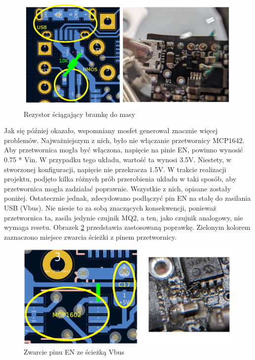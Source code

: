 \begin{figure}[H]
    \centering
    \includegraphics[width=\textwidth, height=\textheight, keepaspectratio]{Graphics/fix_gate.png}
    \caption{Rezystor ściągający bramkę do masy}
    \label{img:fix_gate}
\end{figure}
Jak się później okazało, wspomniany mosfet generował znacznie więcej problemów. Najważniejszym z nich, było nie włączanie przetwornicy MCP1642. Aby przetwornica mogła być włączona, napięcie na pinie EN, powinno wynosić 0.75 * Vin\cite{mcp_datasheet}. W przypadku tego układu, wartość ta wynosi 3.5V. Niestety, w stworzonej konfiguracji, napięcie nie przekracza 1.5V. W trakcie realizacji projektu, podjęto kilka różnych prób przerobienia układu w taki sposób, aby przetwornica mogła zadziałać poprawnie. Wszystkie z nich, opisane zostały poniżej. Ostatecznie jednak, zdecydowano podłączyć pin EN na stałę do zasilania USB (Vbus). Nie niesie to za sobą znaczących konsekwencji, ponieważ przetwornica ta, zasila jedynie czujnik MQ2, a ten, jako czujnik analogowy, nie wymaga resetu. Obrazek \ref{img:fix_mcp1642} przedstawia zastosowaną poprawkę. Zielonym kolorem zaznaczono miejsce zwarcia ścieżki z pinem przetwornicy.
\begin{figure}[H]
    \centering
    \includegraphics[width=\textwidth, height=\textheight, keepaspectratio]{Graphics/fix_mcp1602.png}
    \caption{Zwarcie pinu EN ze ścieżką Vbus}
    \label{img:fix_mcp1642}
\end{figure}
